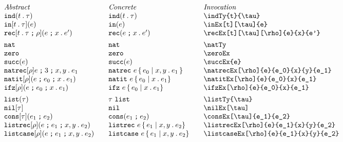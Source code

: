 \documentclass[11pt]{article}
\begin{document}
\begin{figure}

  \begin{small}
    \begin{displaymath}
      \begin{array}{l@{\qquad}l@{\qquad}l@{\qquad}l}
        \textit{Abstract} & \textit{Concrete} & \textit{Invocation} \\
        \indTy{t}{\tau}                      & \indTy*{t}{\tau}                    & \verb|\indTy{t}{\tau}|                         \\
        \inEx[t][\tau]{e}                    & \inEx*{e}                           & \verb|\inEx[t][\tau]{e}|                       \\
        \recEx[t][\tau][\rho]{e}{x}{e'}      & \recEx*{e}{x}{e'}                   & \verb|\recEx[t][\tau][\rho]{e}{x}{e'}|         \\[1ex]

        \natTy                               & \natTy*                             & \verb|\natTy|                                  \\
        \zeroEx                              & \zeroEx*                            & \verb|\zeroEx|                                 \\
        \succEx{e}                           & \succEx*{e}                         & \verb|\succEx{e}|                              \\
        \natrecEx[\rho]{e}{e_0}{x}{y}{e_1}   & \natrecEx*[\rho]{e}{e_0}{x}{y}{e_1} & \verb|\natrecEx[\rho]{e}{e_0}{x}{y}{e_1}|      \\
        \natitEx[\rho]{e}{e_0}{x}{e_1}       & \natitEx*{e}{e_0}{x}{e_1}           & \verb|\natitEx[\rho]{e}{e_0}{x}{e_1}|          \\
        \ifzEx[\rho]{e}{e_0}{x}{e_1}         & \ifzEx*{e}{e_0}{x}{e_1}             & \verb|\ifzEx[\rho]{e}{e_0}{x}{e_1}|            \\[1ex]

        \listTy{\tau}                        & \listTy*{\tau}                      & \verb|\listTy{\tau}|                           \\
        \nilEx[\tau]                         & \nilEx*                             & \verb|\nilEx[\tau]|                            \\
        \consEx[\tau]{e_1}{e_2}              & \consEx*{e_1}{e_2}                  & \verb|\consEx[\tau]{e_1}{e_2}|                 \\
        \listrecEx[\rho]{e}{e_1}{x}{y}{e_2}  & \listrecEx*{e}{e_1}{x}{y}{e_2}      & \verb|\listrecEx[\rho]{e}{e_1}{x}{y}{e_2}|     \\
        \listcaseEx[\rho]{e}{e_1}{x}{y}{e_2} & \listcaseEx*{e}{e_1}{x}{y}{e_2}     & \verb|\listcaseEx[\rho]{e}{e_1}{x}{y}{e_2}|    \\[1ex]


\end{array}
\end{displaymath}
\end{small}
\end{figure}
\end{document}
